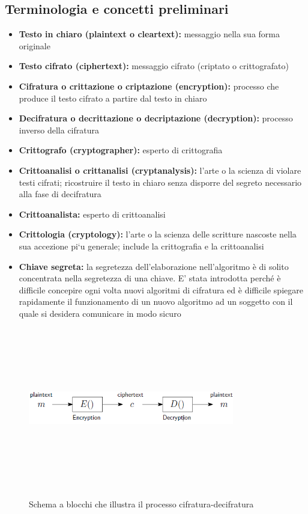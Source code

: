 \subsection{Terminologia e concetti preliminari}
\begin{itemize} 
  \item \textbf{Testo in chiaro (plaintext o cleartext):} messaggio nella sua forma originale
  \item \textbf{Testo cifrato (ciphertext):} messaggio cifrato (criptato o crittografato)
  \item \textbf{Cifratura o crittazione o criptazione (encryption):} processo che produce il testo cifrato a partire dal testo in chiaro
  \item \textbf{Decifratura o decrittazione o decriptazione (decryption):} processo inverso della cifratura
  \item \textbf{Crittografo (cryptographer):} esperto di crittografia
  \item \textbf{Crittoanalisi o crittanalisi (cryptanalysis):} l’arte o la scienza di violare testi cifrati; ricostruire il testo in chiaro senza disporre del segreto necessario alla fase di decifratura
  \item \textbf{Crittoanalista:} esperto di crittoanalisi
  \item \textbf{Crittologia (cryptology):} l’arte o la scienza delle scritture nascoste nella sua accezione pi`u generale; include la crittografia e la crittoanalisi
  \item \textbf{Chiave segreta:} la segretezza dell'elaborazione nell'algoritmo è di solito concentrata nella segretezza di una chiave. E' stata introdotta perché è difficile concepire ogni volta nuovi algoritmi di cifratura ed è difficile spiegare rapidamente il funzionamento di un nuovo    algoritmo ad un soggetto con il quale si desidera comunicare in modo sicuro
\end{itemize}
\begin{figure}[htbp]
	\centering%
	\subfigure%
	{\includegraphics[height=7cm, width=9cm, keepaspectratio]{Immagini/introduzione/schema_blocchi_crittografia.png}}
	\caption{Schema a blocchi che illustra il processo cifratura-decifratura \label{fig:schema_blocchi_crittografia}} 	
\end{figure}

